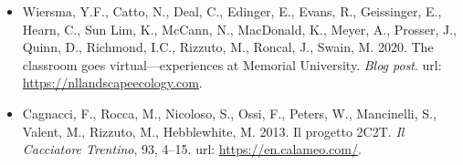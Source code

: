 

\begin{itemize}[noitemsep] 
  \item Wiersma, Y.F., Catto, N., Deal, C., Edinger, E., Evans, R., Geissinger, E., Hearn, C., Sun Lim, K., McCann, N., MacDonald, K., Meyer, A., Prosser, J., Quinn, D., Richmond, I.C., \textcolor{awesome}{Rizzuto, M.}, Roncal, J., Swain, M. 2020. The classroom goes virtual---experiences at Memorial University. \emph{Blog post}. url: \href{https://nllandscapeecology.com/blog-post-teaching-and-learning-remotely-time-to-read-4-min-45-s/}{https://nllandscapeecology.com}.
  \item Cagnacci, F., Rocca, M., Nicoloso, S., Ossi, F., Peters, W., Mancinelli, S., Valent, M., \textcolor{awesome}{Rizzuto, M.}, Hebblewhite, M. 2013. Il progetto 2C2T. \emph{Il Cacciatore Trentino}, 93, 4--15. url: \href{https://en.calameo.com/read/00214567355b1384f96d0}{https://en.calameo.com/}.
\end{itemize}


  


  
